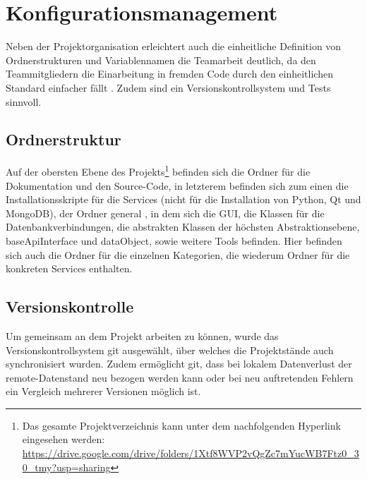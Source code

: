 \section{Konfigurationsmanagement}
Neben der Projektorganisation erleichtert auch die einheitliche Definition von Ordnerstrukturen und Variablennamen die Teamarbeit deutlich, da den Teammitgliedern die Einarbeitung in fremden Code durch den einheitlichen Standard einfacher fällt \cite{Versteegen.2013}. Zudem sind ein Versionskontrollsystem und Tests sinnvoll. 

\subsection{Ordnerstruktur}
Auf der obersten Ebene des Projekts\footnote{Das gesamte Projektverzeichnis kann unter dem nachfolgenden Hyperlink eingesehen werden: \url{https://drive.google.com/drive/folders/1Xtf8WVP2vQgZc7mYucWB7Ftz0_30_tmy?usp=sharing}} befinden sich die Ordner für die Dokumentation und den Source-Code, in letzterem befinden sich zum einen die Installationsskripte für die Services (nicht für die Installation von Python, Qt und MongoDB), der Ordner \glqq general \grqq, in dem sich die GUI, die Klassen für die Datenbankverbindungen, die abstrakten Klassen der höchsten Abstraktionsebene, baseApiInterface und dataObject, sowie weitere Tools befinden. Hier befinden sich auch die Ordner für die einzelnen Kategorien, die wiederum Ordner für die konkreten Services enthalten. 

\subsection{Versionskontrolle}
Um gemeinsam an dem Projekt arbeiten zu können, wurde das Versionskontrollsystem \glqq git \grqq ausgewählt, über welches die Projektstände auch synchronisiert wurden. Zudem ermöglicht git, dass bei lokalem Datenverlust der remote-Datenstand neu bezogen werden kann oder bei neu auftretenden Fehlern ein Vergleich mehrerer Versionen möglich ist. 

